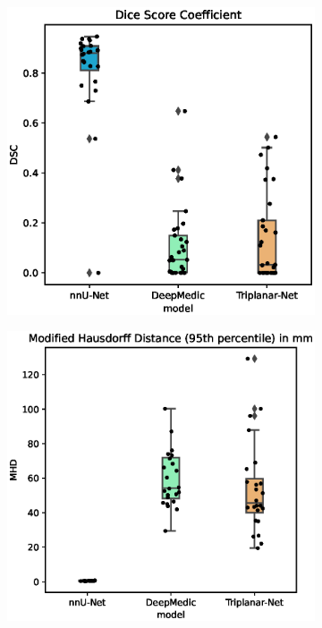 \begin{figure}[htp]
	\centering
	\begin{subfigure}{.6\linewidth}
		\includegraphics[width=\linewidth]{figures/DSC.eps}
	\end{subfigure}
	\begin{subfigure}{.6\linewidth}
		\includegraphics[width=\linewidth]{figures/MHD.eps}
	\end{subfigure}
	\caption[]{}
	\label{fig:results}
\end{figure}
